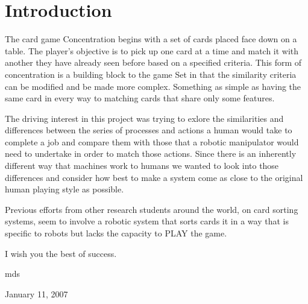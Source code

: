 \section{Introduction}

The card game Concentration begins with a set of cards placed face down on a table. The player's objective is to pick up one card at a time and match it with another they have already seen before based on a specified criteria. This form of concentration is a building block to the game Set in that the similarity criteria can be modified and be made more complex. Something as simple as having the same card in every way to matching cards that share only some features.

The driving interest in this project was trying to exlore the similarities and differences between the series of processes and actions a human would take to complete a job and compare them with those that a robotic manipulator would need to undertake in order to match those actions. Since there is an inherently different way that machines work to humans we wanted to look into those differences and consider how best to make a system come as close to the original human playing style as possible.


Previous efforts from other research students around the world, on card sorting systems, seem to involve a robotic system that sorts cards it in a way that is specific to robots but lacks the capacity to PLAY the game.

I wish you the best of success.

\hfill mds

\hfill January 11, 2007
